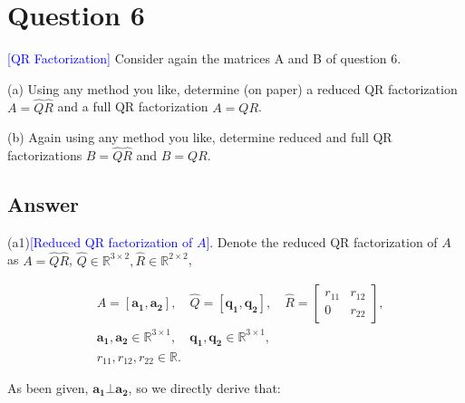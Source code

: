 \section*{Question 6}
\textcolor{blue}{[QR Factorization]} Consider again the matrices A and B of question 6.


(a)  Using any method you like, determine (on paper) a reduced QR factorization $A = \hat{Q}\hat{R}$ and a full QR factorization $A = QR$.


(b)  Again using any method you like, determine reduced and full QR factorizations $B = \hat{Q}\hat{R}$ and $B = QR$.


\subsection*{Answer}

(a1)\textcolor{blue}{[Reduced QR factorization of $A$]}. 
Denote the reduced QR factorization of $A$ as
$A = \hat{Q}\hat{R}$, $
    \hat{Q} \in \mathbb{R}^{3 \times 2},
    \hat{R} \in \mathbb{R}^{2 \times 2} 
    $,

\begin{align*}
    &A = [\mathbf{a_1}, \mathbf{a_2}],
    \quad 
    \hat{Q} = [\mathbf{q_1}, \mathbf{q_2}], \quad
    \hat{R} = \begin{bmatrix}
                r_{11} & r_{12}\\ 0 & r_{22}
            \end{bmatrix},\\
    &\mathbf{a_1, a_2} \in \mathbb{R}^{3\times 1}, \quad
    \mathbf{q_1, q_2} \in \mathbb{R}^{3\times 1},\\
    & r_{11}, r_{12}, r_{22} \in \mathbb{R}.
\end{align*}

As been given, $\mathbf{a_1} \bot \mathbf{a_2}$,
so we directly derive that:

